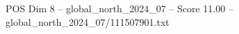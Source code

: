 \begin{textsample}{POS Dim 8 – global\_north\_2024\_07 – Score 11.00 – global\_north\_2024\_07/111507901.txt}
\end{textsample}
